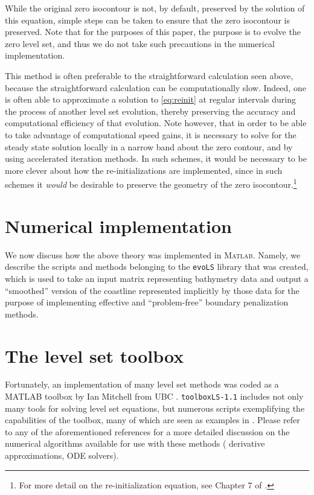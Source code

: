 \documentclass{article}
\begin{document}
While the original zero isocontour is not, by default, preserved
by the solution of this equation, simple steps can be taken to
ensure that the zero isocontour is preserved. Note that for the
purposes of this paper, the purpose is to evolve the zero level
set, and thus we do not take such precautions in the numerical
implementation.

This method is often preferable to the straightforward calculation
seen above, because the straightforward calculation can be
computationally slow. Indeed, one is often able to approximate a
solution to \autoref{eq:reinit} at regular intervals during the
process of another level set evolution, thereby preserving the
accuracy and computational efficiency of that evolution. Note
however, that in order to be able to take advantage of
computational speed gains, it is necessary to solve for the steady
state solution locally in a narrow band about the zero contour,
and by using accelerated iteration methods. In such schemes, it
would be necessary to be more clever about how the
re-initializations are implemented, since in such schemes it
\emph{would} be desirable to preserve the geometry of the zero
isocontour.\footnote{For more detail on the re-initialization
  equation, see Chapter 7 of \cite{osher2003}.}

\section*{Numerical implementation}

We now discuss how the above theory was implemented in
\textsc{Matlab}. Namely, we describe the scripts and methods
belonging to the \texttt{evoLS} library that was created, which is
used to take an input matrix representing bathymetry data and
output a ``smoothed'' version of the coastline represented
implicitly by those data for the purpose of implementing effective
and ``problem-free'' boundary penalization methods.

\section{The level set toolbox}
\label{sec:level-set-toolbox}

Fortunately, an implementation of many level set methods was coded
as a MATLAB toolbox by Ian Mitchell from UBC \cite{toolboxls,
  mitchell}. \texttt{toolboxLS-1.1} includes not only many tools
for solving level set equations, but numerous scripts exemplifying
the capabilities of the toolbox, many of which are seen as
examples in \cite{osher2003}. Please refer to any of the
aforementioned references for a more detailed discussion on the
numerical algorithms available for use with these methods (\eg
derivative approximations, ODE solvers).
\end{document}
